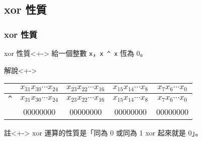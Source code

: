 \documentclass[utf8]{beamer}
\begin{document}
\begin{CJK}{UTF8}{bkai}
\subsection{xor 性質}

\begin{frame}[fragile]
  \frametitle{xor 性質}
  \begin{block}{xor 性質}<+->
  給一個整數 \lstinline{x}{}，\lstinline{x ^ x}{} 恆為 0。
  \end{block}
  \begin{exampleblock}{解說}<+->
    \begin{table}
    \begin{tabular}{|c|c|c|c|c|}
    \hline
      & $x_{31}x_{30}\cdots{x_{24}}$ & $x_{23}x_{22}\cdots{x_{16}}$ & $x_{15}x_{14}\cdots{x_{8}}$ & $x_{7}x_{6}\cdots{x_{0}}$\\
    \hline
     \lstinline{^}{} & $x_{31}x_{30}\cdots{x_{24}}$ & $x_{23}x_{22}\cdots{x_{16}}$ & $x_{15}x_{14}\cdots{x_{8}}$ & $x_{7}x_{6}\cdots{x_{0}}$\\
    \hline
    \hline
      & 00000000 & 00000000 & 00000000 & 00000000\\
    \hline
    \end{tabular}
    \end{table}
  \end{exampleblock}
  \begin{alertblock}{註}<+->
  xor 運算的性質是「同為 0 或同為 1 xor 起來就是 0」。
  \end{alertblock}
\end{frame}


\end{CJK}
\end{document}
